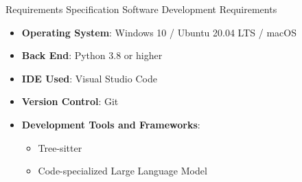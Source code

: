 \documentclass{beamer}
\begin{document}
\begin{frame}{Requirements Specification}
     Software Development Requirements
     \begin{itemize}
     \justifying
        \item \textbf{Operating System}: Windows 10 / Ubuntu 20.04 LTS / macOS
    \item \textbf{Back End}: Python 3.8 or higher
    \item \textbf{IDE Used}: Visual Studio Code
    \item \textbf{Version Control}: Git
    \item \textbf{Development Tools and Frameworks}:
    \begin{itemize}
        \item Tree-sitter
        \item Code-specialized Large Language Model
    \end{itemize}
\end{itemize}
\end{frame}
\end{document}
